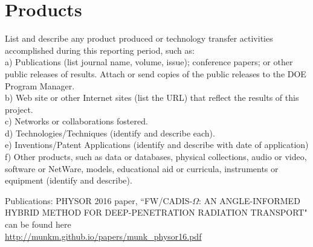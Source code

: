 \documentclass[12pt]{article}
\begin{document}
\section{Products}
\label{sect::products}
List and describe any product produced or technology transfer activities accomplished during this reporting period, such as: \\
a)	Publications (list journal name, volume, issue); conference papers; or other public releases of results.  Attach or send copies of the public releases to the DOE Program Manager. \\
b)	Web site or other Internet sites (list the URL) that reflect the results of this project. \\
c)	Networks or collaborations fostered. \\
d)	Technologies/Techniques (identify and describe each). \\
e)	Inventions/Patent Applications (identify and describe with date of application) \\
f)	Other products, such as data or databases, physical collections, audio or video, software or NetWare, models, educational aid or curricula, instruments or equipment (identify and describe).

Publications: PHYSOR 2016 paper, ``FW/CADIS-$\Omega$: AN ANGLE-INFORMED HYBRID METHOD FOR DEEP-PENETRATION RADIATION TRANSPORT" can be found here\\ \href{http://munkm.github.io/papers/munk_physor16.pdf}{http://munkm.github.io/papers/munk\_physor16.pdf}





\appendix

\makeatletter
\def\@seccntformat#1{APPENDIX \csname the#1\endcsname.~}
\makeatother

%
%
%
\end{document}
